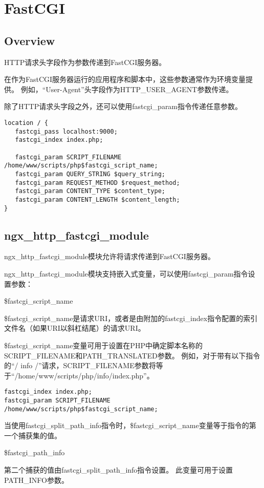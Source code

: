 \part{FastCGI}

\chapter{Overview}

HTTP请求头字段作为参数传递到FastCGI服务器。 

在作为FastCGI服务器运行的应用程序和脚本中，这些参数通常作为环境变量提供。 例如，“User-Agent”头字段作为HTTP\_USER\_AGENT参数传递。

除了HTTP请求头字段之外，还可以使用fastcgi\_param指令传递任意参数。


\begin{lstlisting}
location / {
   fastcgi_pass localhost:9000;
   fastcgi_index index.php;
   
   fastcgi_param SCRIPT_FILENAME /home/www/scripts/php$fastcgi_script_name;
   fastcgi_param QUERY_STRING $query_string;
   fastcgi_param REQUEST_METHOD $request_method;
   fastcgi_param CONTENT_TYPE $content_type;
   fastcgi_param CONTENT_LENGTH $content_length;
}
\end{lstlisting}

\chapter{ngx\_http\_fastcgi\_module}

ngx\_http\_fastcgi\_module模块允许将请求传递到FastCGI服务器。


ngx\_http\_fastcgi\_module模块支持嵌入式变量，可以使用fastcgi\_param指令设置参数：

\begin{compactitem}
\item \$fastcgi\_script\_name

\$fastcgi\_script\_name是请求URI，或者是由附加的fastcgi\_index指令配置的索引文件名（如果URI以斜杠结尾）的请求URI。

\$fastcgi\_script\_name变量可用于设置在PHP中确定脚本名称的SCRIPT\_FILENAME和PATH\_TRANSLATED参数。 例如，对于带有以下指令的“/ info /”请求，SCRIPT\_FILENAME参数将等于“/home/www/scripts/php/info/index.php”。


\begin{lstlisting}
fastcgi_index index.php;
fastcgi_param SCRIPT_FILENAME /home/www/scripts/php$fastcgi_script_name;
\end{lstlisting}

当使用fastcgi\_split\_path\_info指令时，\$fastcgi\_script\_name变量等于指令的第一个捕获集的值。


\item \$fastcgi\_path\_info

第二个捕获的值由fastcgi\_split\_path\_info指令设置。 此变量可用于设置PATH\_INFO参数。
\end{compactitem}


